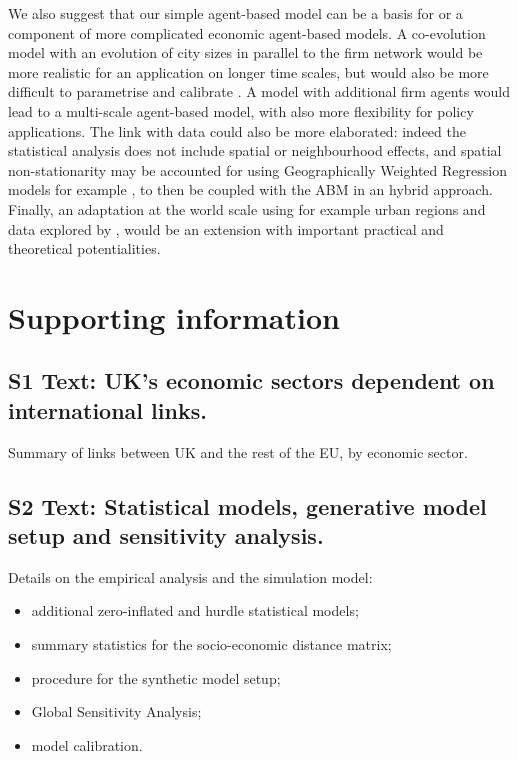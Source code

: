 \documentclass[10pt,letterpaper]{article}
\begin{document}
We also suggest that our simple agent-based model can be a basis for or a component of more complicated economic agent-based models. A co-evolution model with an evolution of city sizes in parallel to the firm network would be more realistic for an application on longer time scales, but would also be more difficult to parametrise and calibrate \cite{raimbault2018characterising}. A model with additional firm agents would lead to a multi-scale agent-based model, with also more flexibility for policy applications. The link with data could also be more elaborated: indeed the statistical analysis does not include spatial or neighbourhood effects, and spatial non-stationarity may be accounted for using Geographically Weighted Regression models for example \cite{comber2021route}, to then be coupled with the ABM in an hybrid approach. Finally, an adaptation at the world scale using for example urban regions and data explored by \cite{rozenblat2021intra}, would be an extension with important practical and theoretical potentialities. 


\section*{Supporting information}

\subsection*{S1 Text: UK's economic sectors dependent on international links.\label{S1Text}}


Summary of links between UK and the rest of the EU, by economic sector.

\subsection*{S2 Text: Statistical models, generative model setup and sensitivity analysis.}
\label{S2Text}

Details on the empirical analysis and the simulation model:

\begin{itemize}
    \item additional zero-inflated and hurdle statistical models;
    \item summary statistics for the socio-economic distance matrix;
    \item procedure for the synthetic model setup;
    \item Global Sensitivity Analysis;
    \item model calibration.
\end{itemize}
\end{document}
